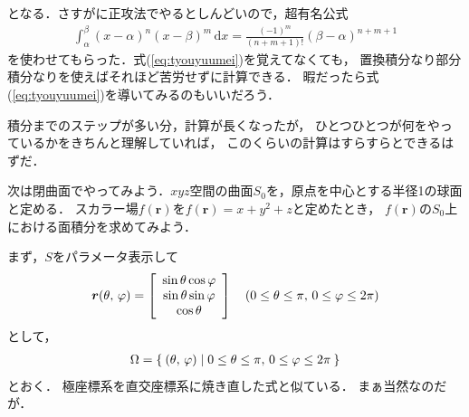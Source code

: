 となる．さすがに正攻法でやるとしんどいので，超有名公式
\begin{align}
\int_{\alpha}^{\beta} (x-\alpha)^n (x-\beta)^m \, \mathrm{d}x
= \frac{ (-1)^m }{ (n+m+1)! } (\beta -\alpha )^{n+m+1}
\label{eq:tyouyuumei}
\end{align}
を使わせてもらった．式(\ref{eq:tyouyuumei})を覚えてなくても，
置換積分なり部分積分なりを使えばそれほど苦労せずに計算できる．
暇だったら式(\ref{eq:tyouyuumei})を導いてみるのもいいだろう．

積分までのステップが多い分，計算が長くなったが，
ひとつひとつが何をやっているかをきちんと理解していれば，
このくらいの計算はすらすらとできるはずだ．

次は閉曲面でやってみよう．$xyz$空間の曲面$S_0$を，原点を中心とする半径1の球面と定める．
スカラー場$f(\bm{r})$を$f(\bm{r}) = x+ y^2+ z$と定めたとき，
$f(\bm{r} )$の$S_0$上における面積分を求めてみよう．

まず，$S$をパラメータ表示して
\begin{align*}
\bm{r} (\theta, \, \varphi) = \left[
\renewcommand{\arraystretch}{1}
\begin{array}{c}
\sin \theta \cos \varphi \\
\sin \theta \sin \varphi \\
\cos \theta 
\end{array}
\right]
\quad (0 \leq \theta \leq \pi , \, 0 \leq \varphi \leq 2 \pi)
\end{align*}
として，
\begin{align*}
\Omega = \Set{ (\theta , \, \varphi) | 0 \leq \theta \leq \pi , \, 0 \leq \varphi \leq 2 \pi }
\end{align*}
とおく．
極座標系を直交座標系に焼き直した式と似ている．
まぁ当然なのだが．

